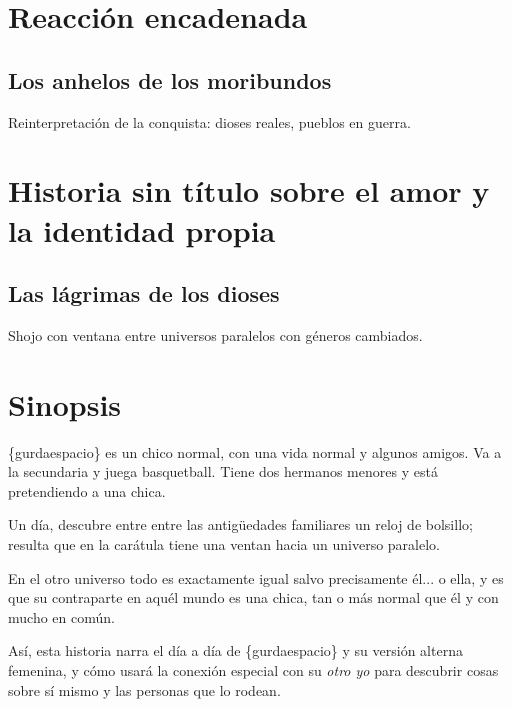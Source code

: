 \documentclass[letterpaper,12pt]{article}
\begin{document}
	\subsubsection*{}
	
	\newpage
	
	\section*{Reacción encadenada}
	
	\subsection*{Los anhelos de los moribundos}
	
	Reinterpretación de la conquista: dioses reales, pueblos en guerra.
	
	\newpage
	
	\section*{Historia sin título sobre el amor y la identidad propia}
	
	\subsection*{Las lágrimas de los dioses}
	
	Shojo con ventana entre universos paralelos con géneros cambiados.
	
	\section*{Sinopsis}
	
	\{gurdaespacio\} es un chico normal, con una vida normal y algunos amigos.
	Va a la secundaria y juega basquetball. Tiene dos hermanos menores y
	está pretendiendo a una chica.
	
	Un día, descubre entre entre las antigüedades familiares un reloj de bolsillo;
	resulta que en la carátula tiene una ventan hacia un universo paralelo.
	
	En el otro universo todo es exactamente igual salvo precisamente él... o ella,
	y es que su contraparte en aquél mundo es una chica, tan o más normal que él 
	y con mucho en común.
	
	Así, esta historia narra el día a día de \{gurdaespacio\} y su versión alterna
	femenina, y cómo usará la conexión especial con su \textit{otro yo} para
	descubrir cosas sobre sí mismo y las personas que lo rodean.
	
\end{document}
